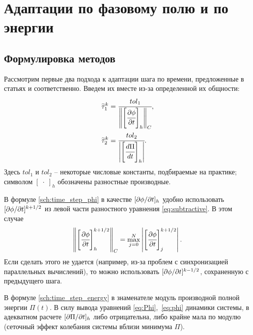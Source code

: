 
\section{Адаптации по фазовому полю и по энергии}

\subsection{Формулировка методов}

Рассмотрим первые два подхода к адаптации шага по времени, предложенные в статьях \cite{li_time_step} и \cite{zhang_time_step} соответственно. Введем их вместе из-за определенной их общности:
\begin{align}
	\widetilde{\tau}_1^k & = \cfrac{tol_1}{\left\| \left[ \cfrac{\partial \phi}{\partial t} \right]_h \right\|_C},
	\label{sch:time_step_phi} \\
	\widetilde{\tau}_2^k & = \cfrac{tol_2}{\left| \left[ \cfrac{d \Pi}{dt} \right]_h \right|}.
	\label{sch:time_step_energy}
\end{align}
Здесь $tol_1$ и $tol_2$ -- некоторые числовые константы, подбираемые на практике; символом $[\; \cdot \;]_h$ обозначены разностные производные.

В формуле \eqref{sch:time_step_phi} в качестве $[\partial \phi / \partial t]_h$ удобно использовать $[\partial \phi / \partial t]^{k + 1/2}$ из левой части разностного уравнения \eqref{eq:subtractive}. В этом случае
\[
	\left\| \left[ \cfrac{\partial \phi}{\partial t} \right]_h^{k + 1/2} \right\|_C = \max\limits_{j = 0}^N \left| \left[ \cfrac{\partial \phi}{\partial t} \right]_j^{k + 1/2} \right|.
\]
Если сделать этого не удается (например, из-за проблем с синхронизацией параллельных вычислений), то можно использовать $[\partial \phi / \partial t]^{k - 1/2}$, сохраненную с предыдущего шага.

В формуле \eqref{sch:time_step_energy} в знаменателе модуль производной полной энергии $\Pi(t)$. В силу вывода уравнений \eqref{eq:Phi},~\eqref{eq:phi} динамики системы, в адекватном расчете $[\partial \Pi / \partial t]_h$ либо отрицательна, либо крайне мала по модулю (сеточный эффект колебания системы вблизи минимума $\Pi$).

